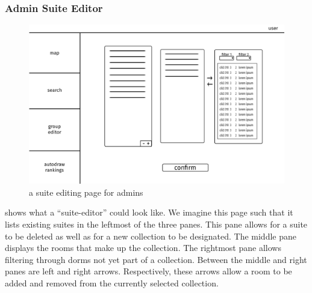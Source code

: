 \subsubsection{Admin Suite Editor}
\begin{figure} \centering
\includegraphics[scale=.15]{wireframe/admin_suite_editor}
\caption{a suite editing page for admins}
\label{fig:wireadmin-suite-editor}
\end{figure}

 shows what a ``suite-editor'' could look like.
We imagine this page such that it lists existing suites in the leftmost of the
three panes. This pane allows for a suite to be deleted as well as for a new
collection to be designated. The middle pane displays the rooms that make up the
collection. The rightmost pane allows filtering through dorms not yet part of a
collection. Between the middle and right panes are left and right arrows.
Respectively, these arrows allow a room to be added and removed from the
currently selected collection.

